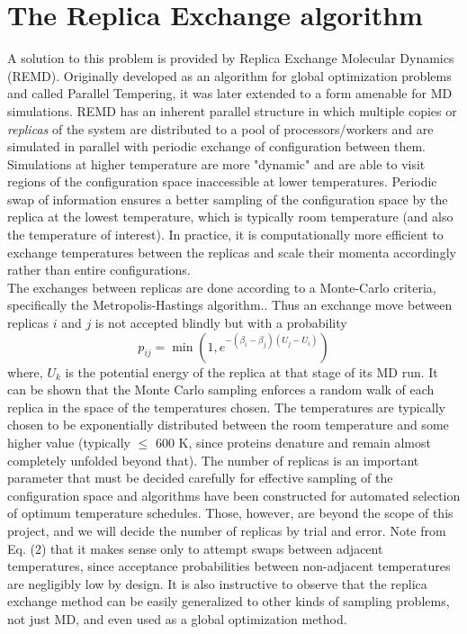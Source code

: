 \documentclass[12pt,letterpaper]{article}
\begin{document}
\section*{The Replica Exchange algorithm} 
A solution to this problem is provided by Replica Exchange Molecular Dynamics (REMD). Originally developed as an algorithm for global optimization problems and called Parallel Tempering\cite{wang86}, it was later extended to a form amenable for MD simulations.\cite{okamoto99} REMD has an inherent parallel structure in which multiple copies or \textit{replicas} of the system are distributed to a pool of processors/workers and are simulated in parallel with periodic exchange of configuration between them. Simulations at higher temperature are more "dynamic" and are able to visit regions of the configuration space inaccessible at lower temperatures. Periodic swap of information ensures a better sampling of the configuration space by the replica at the lowest temperature, which is typically room temperature (and also the temperature of interest). In practice, it is computationally more efficient to exchange temperatures between the replicas and scale their momenta accordingly rather than entire configurations.\\

\noindent The exchanges between replicas are done according to a Monte-Carlo criteria, specifically the Metropolis-Hastings algorithm.\cite{hastings70}. Thus an exchange move between replicas $i$ and $j$ is not accepted blindly but with a probability 
%
\begin{equation}
p_{ij} = \min(1, e^{-(\beta_i - \beta_j)(U_j - U_i)})
\end{equation}
%
where, $U_k$ is the potential energy of the replica at that stage of its MD run. It can be shown that the Monte Carlo sampling enforces a random walk of each replica in the space of the temperatures chosen. The temperatures are typically chosen to be exponentially distributed between the room temperature and some higher value (typically $ \leq $ 600 K, since proteins denature and remain almost completely unfolded beyond that). The number of replicas is an important parameter that must be decided carefully for effective sampling of the configuration space and algorithms have been constructed for automated selection of optimum temperature schedules. Those, however, are beyond the scope of this project, and we will decide the number of replicas by trial and error. Note from Eq. (2) that it makes sense only to attempt swaps between adjacent temperatures, since acceptance probabilities between non-adjacent temperatures are negligibly low by design. It is also instructive to observe that the replica exchange method can be easily generalized to other kinds of sampling problems, not just MD, and even used as a global optimization method.
\end{document}
